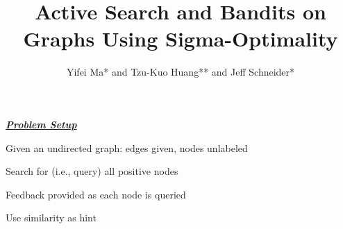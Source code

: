 \documentclass[size36_42,landscape]{a0poster}
\newenvironment{coldinglist}[2]	    {
\begin{list}
  {\textcolor{#2}{\ding{#1}}}{
\setlength{\parskip}{0pt}
\setlength{\itemsep}{0pt}
\setlength{\parsep}{0pt}
}
	}
	{\end{list}}
\newcommand{\paragraphHeader}[1]{\vspace{1cm}\par{\LARGE\bf\color{darkpastelgreen} \it{\underline{\hspace{.5em}#1\hspace{.5em}}}}\par\vspace{1cm}}
\begin{document}
\title{Active Search and Bandits on Graphs Using Sigma-Optimality}
\author{Yifei Ma* and Tzu-Kuo Huang** and Jeff Schneider*}
\address{*Auton Lab, School of Computer Science, Carnegie Mellon University.  **Microsoft Research}
\makeheader



\begin{multicols}{3}
\fontsize{36pt}{43pt}\selectfont
\setlength{\columnsep}{1.5cm}
\setlength{\columnseprule}{0.3pt}


\paragraphHeader{Problem Setup}

\begin{coldinglist}{113}{blue}
\item Given an undirected graph: edges given, nodes unlabeled
\item Search for (i.e., query) all positive nodes
\item Feedback provided as each node is queried
\item Use similarity as hint
\end{coldinglist}


\usetikzlibrary{positioning}


\newcommand{\nodeDist}{3cm}

\newcommand{\toyPlot}{
  \node [nil] (n1) {};
  \node [nil, position=20:{\nodeDist} from n1] (n2) {};
  \node [nil, position=45:{\nodeDist} from n2] (n3) {};
  \node [nil, position=-90:{1.5*\nodeDist} from n3] (n4) {};
  \node [nil, position=0:{1.5*\nodeDist} from n2] (n5) {};
  \node [nil, position=-60:{\nodeDist} from n5] (n6) {};
  \node [nil, position=-80:{\nodeDist} from n6] (n7) {};
  \node [nil, position=-60:{\nodeDist} from n7] (n8) {};
  \node [nil, position=0:{2*\nodeDist} from n8] (n9) {};
  \node [nil, position=10:{\nodeDist} from n8] (n10) {};
  \node [nil, position=60:{\nodeDist} from n8] (n11) {};
  \node [nil, position=60:{\nodeDist} from n11] (n12) {};
  \node [nil, position=60:{\nodeDist} from n12] (n13) {};   \node [nil, position=40:{\nodeDist} from n13] (n14) {};   \node [nil, position=-40:{\nodeDist} from n14] (n15) {};   \node [nil, position=20:{\nodeDist} from n14] (n16) {};
  \node [nil, position=-20:{\nodeDist} from n16] (n17) {};

}
\end{multicols}
\end{document}
